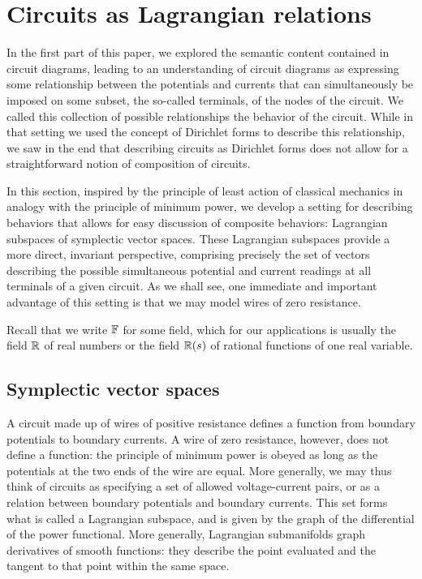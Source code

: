 \section{Circuits as Lagrangian relations} \label{sec:circlagr}
In the first part of this paper, we explored the semantic content contained in
circuit diagrams, leading to an understanding of circuit diagrams as expressing
some relationship between the potentials and currents that can simultaneously be
imposed on some subset, the so-called terminals, of the nodes of the circuit. We
called this collection of possible relationships the behavior of the circuit.
While in that setting we used the concept of Dirichlet forms to describe this
relationship, we saw in the end that describing circuits as Dirichlet forms does
not allow for a straightforward notion of composition of circuits. 

In this section, inspired by the principle of least action of classical
mechanics in analogy with the principle of minimum power, we develop a setting
for describing behaviors that allows for easy discussion of composite
behaviors: Lagrangian subspaces of symplectic vector spaces. These Lagrangian
subspaces provide a more direct, invariant perspective, comprising precisely the
set of vectors describing the possible simultaneous potential and current
readings at all terminals of a given circuit. As we shall see, one immediate and
important advantage of this setting is that we may model wires of zero
resistance.

Recall that we write ${\mathbb F}$ for some field, which for our applications is
usually the field ${\mathbb{R}}$ of real numbers or the field ${\mathbb{R}}(s)$ of rational
functions of one real variable.

\subsection{Symplectic vector spaces}

A circuit made up of wires of positive resistance defines a function from
boundary potentials to boundary currents. A wire of zero resistance, however,
does not define a function: the principle of minimum power is obeyed as long as
the potentials at the two ends of the wire are equal. More generally, we may
thus think of circuits as specifying a set of allowed voltage-current pairs, or
as a relation between boundary potentials and boundary currents. This set forms
what is called a Lagrangian subspace, and is given by the graph of the
differential of the power functional. More generally, Lagrangian submanifolds
graph derivatives of smooth functions: they describe the point evaluated and the
tangent to that point within the same space.

